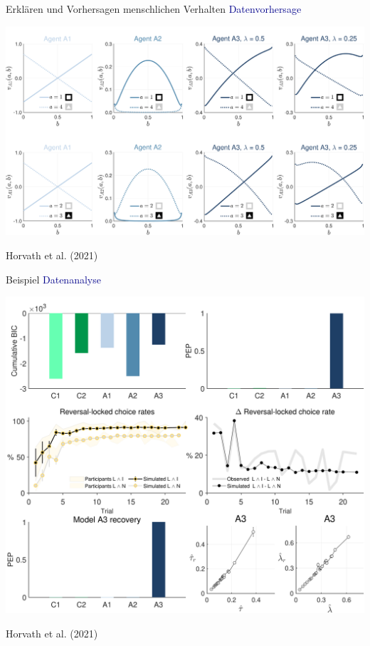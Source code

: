 \documentclass[
  8pt,
  ignorenonframetext,
]{beamer}
\begin{document}
\begin{frame}{Erklären und Vorhersagen menschlichen Verhalten}
\protect\hypertarget{erkluxe4ren-und-vorhersagen-menschlichen-verhalten-4}{}
\textcolor{darkblue}{Datenvorhersage} \vspace{2mm}

\begin{center}\includegraphics[width=0.8\linewidth]{2_Abbildungen/pfm_2_horvath_datenvorhersage} \end{center}

\flushright
\footnotesize

Horvath et al. (2021)
\end{frame}

\begin{frame}{Beispiel}
\protect\hypertarget{beispiel-2}{}
\textcolor{darkblue}{Datenanalyse}

\begin{center}\includegraphics[width=0.65\linewidth]{2_Abbildungen/pfm_2_horvath_datenanalyse} \end{center}

\flushright
\footnotesize

Horvath et al. (2021)
\end{frame}
\end{document}
